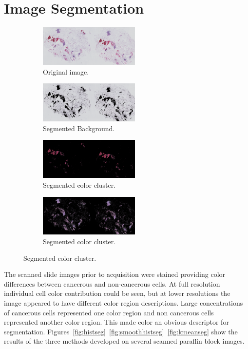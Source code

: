 \documentclass[letterpaper,10pt,oneside]{article}
\begin{document}

\section{Image Segmentation}
\begin{figure}[hbpt]
  \centering
  \begin{subfigure}{5cm}
    \includegraphics[width=5cm]{images/PO13-00516A1_1_7_201305171148_half.png}
    \caption{Original image.}
  \end{subfigure}
  \begin{subfigure}{5cm}
    \includegraphics[width=5cm]{images/PO13-00516A1_1_7_201305171148_cluster_1.png}
    \caption{Segmented Background.}
  \end{subfigure}
  \begin{subfigure}{5cm}
    \includegraphics[width=5cm]{images/PO13-00516A1_1_7_201305171148_cluster_2.png}
    \caption{Segmented color cluster.}
  \end{subfigure}
  \begin{subfigure}{5cm}
    \includegraphics[width=5cm]{images/PO13-00516A1_1_7_201305171148_cluster_3.png}
    \caption{Segmented color cluster.}
  \end{subfigure}
\end{figure}
The scanned slide images prior to acquisition were stained providing color differences between cancerous and non-cancerous cells. At full resolution individual cell color contribution could be seen, but at lower resolutions the image appeared to have different color region descriptions. Large concentrations of cancerous cells represented one color region and non cancerous cells represented another color region. This made color an obvious descriptor for segmentation. Figures~\ref{fig:histseg}~\ref{fig:smoothhistseg}~\ref{fig:kmeanseg} show the results of the three methods developed on several scanned paraffin block images.
\end{document}
